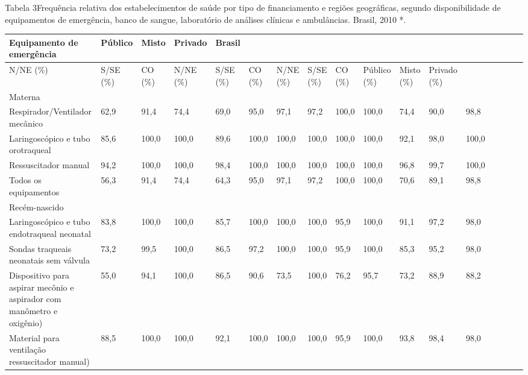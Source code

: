 \documentclass{article}
\begin{document}
Tabela 3Frequência relativa dos estabelecimentos de saúde por tipo de
financiamento e regiões geográficas, segundo disponibilidade de
equipamentos de emergência, banco de sangue, laboratório de análises
clínicas e ambulâncias. Brasil, 2010 *.
\begin{table}
\begin{xtabular}{ l | l | l | l | l l | l | l | l | l | l | l | l | l | l | l |
l }
\hline
Equipamento de
emergência & Público & Misto & Privado & Brasil\\ \hline
N/NE (\%) & S/SE (\%) & CO (\%) & N/NE (\%) & S/SE (\%) & CO (\%) & N/NE (\%) &
S/SE (\%) & CO (\%) & Público (\%) & Misto (\%) & Privado (\%)\\ \hline
Materna
&
&
&
&
&
&
&
&
&
&
&
&
\\ \hline

Respirador/Ventilador mecânico
& 62,9
& 91,4
& 74,4
& 69,0
& 95,0
& 97,1
& 97,2
& 100,0
& 100,0
& 74,4
& 90,0
& 98,8
\\ \hline

Laringoscópico e tubo orotraqueal
& 85,6
& 100,0
& 100,0
& 89,6
& 100,0
& 100,0
& 100,0
& 100,0
& 100,0
& 92,1
& 98,0
& 100,0
\\ \hline

Ressuscitador manual
& 94,2
& 100,0
& 100,0
& 98,4
& 100,0
& 100,0
& 100,0
& 100,0
& 100,0
& 96,8
& 99,7
& 100,0
\\ \hline

Todos os equipamentos
& 56,3
& 91,4
& 74,4
& 64,3
& 95,0
& 97,1
& 97,2
& 100,0
& 100,0
& 70,6
& 89,1
& 98,8
\\ \hline

Recém-nascido
&
&
&
&
&
&
&
&
&
&
&
&
\\ \hline

Laringoscópico e tubo endotraqueal neonatal
& 83,8
& 100,0
& 100,0
& 85,7
& 100,0
& 100,0
& 100,0
& 95,9
& 100,0
& 91,1
& 97,2
& 98,0
\\ \hline

Sondas traqueais neonatais sem válvula
& 73,2
& 99,5
& 100,0
& 86,5
& 97,2
& 100,0
& 100,0
& 95,9
& 100,0
& 85,3
& 95,2
& 98,0
\\ \hline

Dispositivo para aspirar mecônio e aspirador com
manômetro e oxigênio)
& 55,0
& 94,1
& 100,0
& 86,5
& 90,6
& 73,5
& 100,0
& 76,2
& 95,7
& 73,2
& 88,9
& 88,2
\\ \hline

Material para ventilação ressuscitador
manual)
& 88,5
& 100,0
& 100,0
& 92,1
& 100,0
& 100,0
& 100,0
& 95,9
& 100,0
& 93,8
& 98,4
& 98,0
\\ \hline


\end{xtabular}
\end{table}
\end{document}
